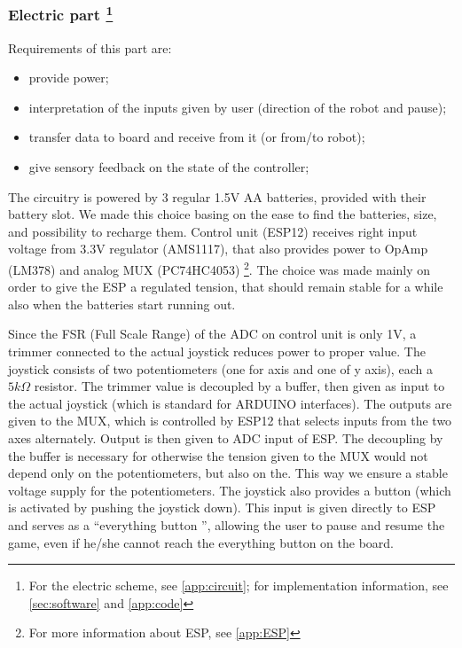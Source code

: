 \documentclass[a4paper,twoside]{book}
\begin{document}
\subsubsection[Electric part]{Electric part \footnote{For the electric scheme, see \autoref{app:circuit}; for implementation information, see \autoref{sec:software} and \autoref{app:code}}}
Requirements of this part are: 
\begin{itemize}
\item provide power;
\item interpretation of the inputs given by user (direction of the robot and pause);
\item transfer data to board and receive from it (or from/to robot);
\item give sensory feedback on the state of the controller;
\end{itemize}
The circuitry is powered by 3 regular 1.5V AA batteries, provided with their battery slot. We made this choice basing on the ease to find the batteries, size, and possibility to recharge them. Control unit (ESP12) receives right input voltage from 3.3V regulator (AMS1117), that also provides power to Op\textendash Amp (LM378) and analog MUX (PC74HC4053)
\footnote{For more information about ESP, see \autoref{app:ESP}}.
The choice was made mainly on order to give the ESP a regulated tension, that should remain stable for a while also when the batteries start running out.

Since the FSR (Full Scale Range) of the ADC on control unit is only 1V, a trimmer connected to the actual joystick reduces power to proper value. The joystick consists of two potentiometers (one for axis and one of y axis), each a $5k\Omega$ resistor.
The trimmer value is decoupled by a buffer, then given as input to the actual joystick (which is standard for ARDUINO interfaces). The outputs are given to the MUX, which is controlled by ESP12 that selects inputs from the two axes alternately. Output is then given to ADC input of ESP. The decoupling by the buffer is necessary for otherwise the tension given to the MUX would not depend only on the potentiometers, but also on the. This way we ensure a stable voltage supply for the potentiometers. 
The joystick also provides a button (which is activated by pushing the joystick down). This input is given directly to ESP and serves as a \textquotedblleft everything button \textquotedblright, allowing the user to pause and resume the game, even if he/she cannot reach the everything button on the board.
\end{document}
